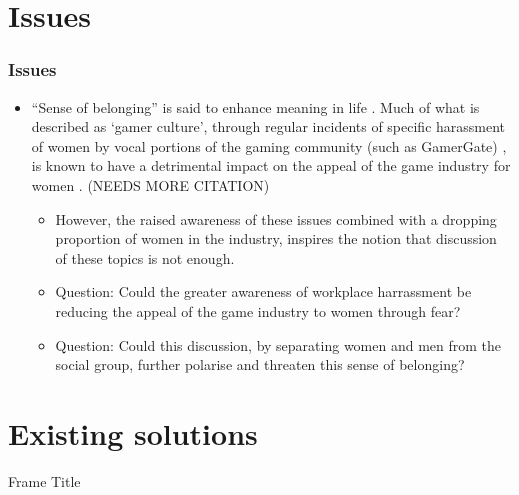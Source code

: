 \documentclass{beamer}
\begin{document}
\section{Issues}
\begin{frame}
    \frametitle{Issues}
    \begin{itemize}
        \item ``Sense of belonging'' is said to enhance meaning in life \cite{lambert_belonging_2013}. Much of what is described as `gamer culture', through regular incidents of specific harassment of women by vocal portions of the gaming community (such as GamerGate) \cite{riot_lawsuit, gonzalez_boysclub_2014}, is known to have a detrimental impact on the appeal of the game industry for women \cite{gonzalez_boysclub_2014}. (NEEDS MORE CITATION) %
        \begin{itemize}
            \item However, the raised awareness of these issues combined with a dropping proportion of women in the industry, inspires the notion that discussion of these topics is not enough.
            \item Question: Could the greater awareness of workplace harrassment be reducing the appeal of the game industry to women through fear?
            \item Question: Could this discussion, by separating women and men from the social group, further polarise and threaten this sense of belonging?
        \end{itemize}
    \end{itemize}

\end{frame}

\section{Existing solutions}
\begin{frame}{Frame Title}
\end{frame}
\end{document}
